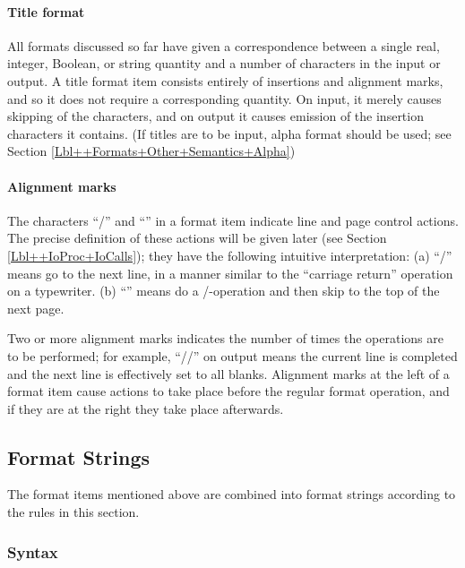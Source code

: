 \documentclass[a4paper,11pt]{article}
\begin{document}
\paragraph{Title format}

All formats discussed so far have given a correspondence between a
single \Algol real, integer, Boolean, or string quantity and a number
of characters in the input or output.  A title format item consists
entirely of insertions and alignment marks, and so it does not require
a corresponding \Algol quantity.  On input, it merely causes skipping
of the characters, and on output it causes emission of the insertion
characters it contains. (If titles are to be input, alpha format
should be used; see Section \ref{Lbl++Formats+Other+Semantics+Alpha})


\paragraph{Alignment marks}

The characters ``/'' and ``\mpow{}'' in a format item indicate line
and page control actions.  The precise definition of these actions
will be given later (see Section \ref{Lbl++IoProc+IoCalls}); they have
the following intuitive interpretation: (a) ``/'' means go to the next
line, in a manner similar to the ``carriage return'' operation on a
typewriter. (b) ``\mpow{}'' means do a /-operation and then skip to
the top of the next page.

Two or more alignment marks indicates the number of times the
operations are to be performed; for example, ``//'' on output means
the current line is completed and the next line is effectively set to
all blanks.  Alignment marks at the left of a format item cause
actions to take place before the regular format operation, and if they
are at the right they take place afterwards.



\subsection{Format Strings}
\label{Lbl++Formats+FormatStrings}

The format items mentioned above are combined into format strings
according to the rules in this section.

\subsubsection{Syntax}
\end{document}
